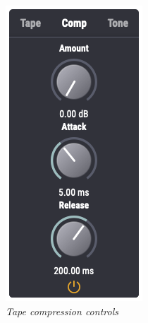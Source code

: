 \documentclass[landscape,twocolumn,a5paper]{manual}
\begin{document}
\begin{figure}[ht]
    \center
    \includegraphics[height=0.35\paperheight]{../Plugin/Screenshots/Comp.png}
    \caption{\label{comp_controls}{\it Tape compression controls}}
\end{figure}
%
\end{document}
